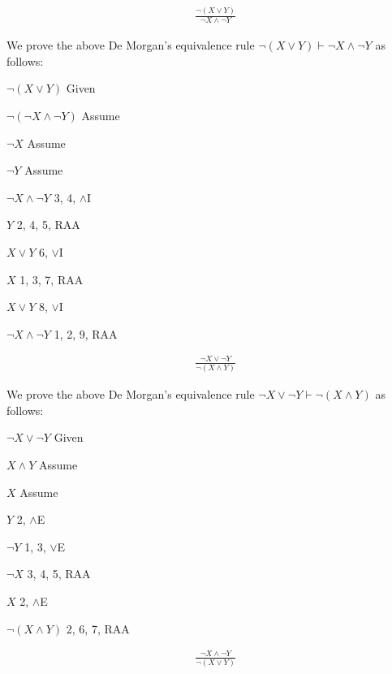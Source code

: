 \documentclass{article}
\newcommand{\indentitem}{\addtolength\itemindent{20pt}}
\theoremstyle{plain}
\theoremstyle{definition}
\begin{document}
\begin{multicols}{2}
\begin{enumerate}
\end{enumerate} 
\begin{align*}
 &\frac{\lnot (X \lor Y)}{\lnot X \land \lnot Y}
\end{align*}  

\noindent We prove the above De Morgan's equivalence rule $\lnot (X \lor Y) \vdash \lnot X \land \lnot Y$ as follows:

\begin{enumerate}
\item $\lnot (X \lor Y)$ \hfill Given
{\indentitem
\item $\lnot (\lnot X \land \lnot Y)$ \hfill Assume
{\indentitem
\item $\lnot X$ \hfill Assume
{\indentitem
\item $\lnot Y$ \hfill Assume
\item $\lnot X \land \lnot Y$ \hfill 3, 4, $\land$I
}
\item $Y$ \hfill 2, 4, 5, RAA
\item $X \lor Y$ \hfill 6, $\lor$I
}
\item $X$ \hfill 1, 3, 7, RAA
\item $X \lor Y$ \hfill 8, $\lor$I
}
\item $\lnot X \land \lnot Y$ \hfill 1, 2, 9, RAA
\end{enumerate}
 
\begin{align*}
 &\frac{\lnot X \lor \lnot Y}{\lnot (X \land Y)}
\end{align*}  

\noindent We prove the above De Morgan's equivalence rule $\lnot X \lor \lnot Y \vdash \lnot (X \land Y)$ as follows:

\begin{enumerate}
\item $\lnot X \lor \lnot Y$ \hfill Given
{\indentitem
\item $X \land Y$ \hfill Assume
{\indentitem
\item $X$ \hfill Assume
\item $Y$ \hfill 2, $\land$E
\item $\lnot Y$ \hfill 1, 3, $\lor$E
}
\item $\lnot X$ \hfill 3, 4, 5, RAA
\item $X$ \hfill 2, $\land$E
}
\item $\lnot (X \land Y)$ \hfill 2, 6, 7, RAA
\end{enumerate}

\begin{align*}
 &\frac{\lnot X \land \lnot Y}{\lnot (X \lor Y)}
\end{align*}  


\end{multicols}
\end{document}
